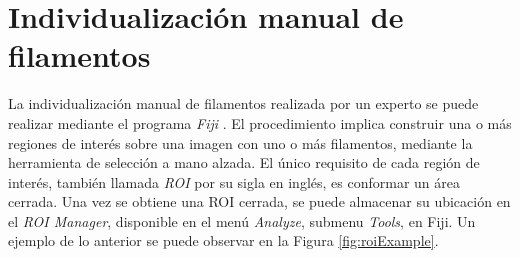 

\section{Individualizaci\'on manual de filamentos}
\label{anex:manualIndiv}

La individualizaci\'on manual de filamentos realizada por un experto se puede realizar mediante el programa {\it Fiji} . El procedimiento implica construir una o m\'as regiones de inter\'es sobre una imagen con uno o m\'as filamentos, mediante la herramienta de selecci\'on a mano alzada. El único requisito de cada región de inter\'es, tambi\'en llamada {\it ROI} por su sigla en ingl\'es, es conformar un \'area cerrada. Una vez se obtiene una ROI cerrada, se puede almacenar su ubicaci\'on en el {\it ROI Manager}, disponible en el men\'u {\it Analyze}, submenu {\it Tools}, en Fiji. Un ejemplo de lo anterior se puede observar en la Figura \ref{fig:roiExample}.

